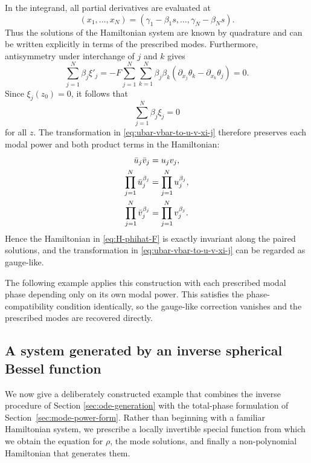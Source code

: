\documentclass[11pt,a4paper]{article}
\numberwithin{equation}{section}
\begin{document}
In the integrand, all partial derivatives are evaluated at
\begin{equation}
    (x_1,\dots,x_N)
    =
    (\gamma_1-\beta_1s,\dots,\gamma_N-\beta_Ns).
\end{equation}
Thus the solutions of the Hamiltonian system are known by quadrature and can be written explicitly in terms of the prescribed modes.
Furthermore, antisymmetry under interchange of $j$ and $k$ gives
\begin{equation}
    \sum_{j=1}^{N}\beta_j\xi'_j
    =
    -F\sum_{j=1}^{N}\sum_{k=1}^{N}\beta_j\beta_k
    \left(\partial_{x_j}\theta_k - \partial_{x_k}\theta_j\right)
    =0.
\end{equation}
Since $\xi_j(z_0)=0$, it follows that
\begin{equation}
    \sum_{j=1}^{N}\beta_j\xi_j=0
\end{equation}
for all $z$. The transformation in \eqref{eq:ubar-vbar-to-u-v-xi-j} therefore preserves each modal power and both product terms in the Hamiltonian:
\begin{align}
    \bar{u}_j\bar{v}_j &= u_jv_j, \notag \\
    \prod_{j=1}^{N}\bar{u}_j^{\beta_j} &= \prod_{j=1}^{N}u_j^{\beta_j}, \notag \\
    \prod_{j=1}^{N}\bar{v}_j^{\beta_j} &= \prod_{j=1}^{N}v_j^{\beta_j}.
\end{align}
Hence the Hamiltonian in \eqref{eq:H-phihat-F} is exactly invariant along the paired solutions, and the transformation in \eqref{eq:ubar-vbar-to-u-v-xi-j} can be regarded as gauge-like.

The following example applies this construction with each prescribed modal phase depending only on its own modal power. This satisfies the phase-compatibility condition identically, so the gauge-like correction vanishes and the prescribed modes are recovered directly.

\subsection{A system generated by an inverse spherical Bessel function}
\label{sec:inverse-spherical-bessel-example}

We now give a deliberately constructed example that combines the inverse procedure of Section \ref{sec:ode-generation} with the total-phase formulation of Section~\ref{sec:mode-power-form}.
Rather than beginning with a familiar Hamiltonian system, we prescribe a locally invertible special function from which we obtain the equation for $\rho$, the mode solutions, and finally a non-polynomial Hamiltonian that generates them.
\end{document}

